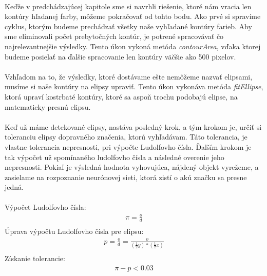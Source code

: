\documentclass[12pt]{article}
\begin{document}
\paragraph{}
Keďže v predchádzajúcej kapitole sme si navrhli riešenie, ktoré nám vracia len kontúry hľadanej farby, môžeme pokračovať od tohto bodu.
Ako prvé si spravíme cyklus, ktorým budeme prechádzať všetky naše vyhľadané kontúry farieb. Aby sme eliminovali počet prebytočných kontúr, 
je potrené spracovávať čo najrelevantnejšie výsledky. Tento úkon vykoná metóda \emph{contourArea}, vďaka ktorej budeme posielať na ďalšie spracovanie len kontúry väčšie ako 500 pixelov.
\paragraph{}
Vzhľadom na to, že výsledky, ktoré dostávame ešte nemôžeme nazvať elipsami, musíme si naše kontúry na elipsy upraviť.
Tento úkon vykonáva metóda \emph{fitEllipse}, ktorá upraví kostrbaté kontúry, ktoré sa aspoň trochu podobajú elipse, na matematicky presnú elipsu.
\linebreak
\linebreak
\paragraph{}
Keď už máme detekované elipsy, nastáva posledný krok, a tým krokom je, určiť si toleranciu elipsy dopravného značenia, ktorú vyhľadávam.
Táto tolerancia, je vlastne tolerancia nepresnosti, pri výpočte Ludolfovho čísla. 
Ďalším krokom je tak výpočet už spomínaného ludolfovho čísla a následné overenie jeho nepresnosti. 
Pokiaľ je výsledná hodnota vyhovujúca, nájdený objekt vyrežeme, a zasielame na rozpoznanie neurónovej sieti, ktorá zistí o akú značku sa presne jedná.
\paragraph{}
Výpočet Ludolfovho čísla:
\begin{align*}
          \pi = \frac{o}{d} \\
\end{align*}
Úprava výpočtu Ludolfovho čísla pre elipsu:
\begin{align*}
          p = \frac{o}{d} = \frac{o}{(\frac{1}{2} y) * ( \frac{1}{2} x)} \\
\end{align*}
Získanie tolerancie:
\begin{align*}
          \pi - p < 0.03 \\
\end{align*}
\end{document}
